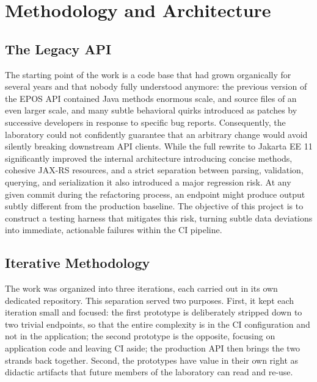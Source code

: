 \chapter{Methodology and Architecture}
\label{chap:metodo-arq}

\section{The Legacy API}
\label{sec:legacy}

The starting point of the work is a code base that had grown organically for
several years and that nobody fully understood anymore: the previous
version of the \ac{EPOS} \ac{API} contained Java methods enormous scale, and
source files of an even larger scale, and many subtle behavioral quirks
introduced as patches by successive developers in response to specific bug
reports. Consequently, the laboratory could not confidently guarantee that
an arbitrary change would avoid silently breaking downstream \ac{API} clients.
While the full rewrite to Jakarta EE 11 significantly improved the internal
architecture introducing concise methods, cohesive \ac{JAX-RS} resources, and
a strict separation between parsing, validation, querying, and
serialization it also introduced a major regression risk. At any given commit
during the refactoring process, an endpoint might produce output subtly
different from the production baseline. The objective of this project is to construct
a testing harness that mitigates this risk, turning subtle data deviations
into immediate, actionable failures within the \ac{CI} pipeline.

\section{Iterative Methodology}
\label{sec:methodology}

The work was organized into three iterations, each carried out in its own
dedicated repository. This separation served two purposes. First, it kept each
iteration small and focused: the first prototype is deliberately stripped
down to two trivial endpoints, so that the entire complexity is in the \ac{CI}
configuration and not in the application; the second prototype is the opposite,
focusing on application code and leaving \ac{CI} aside; the production \ac{API}
then brings the two strands back together. Second, the prototypes have value
in their own right as didactic artifacts that future members of the laboratory
can read and re-use.

